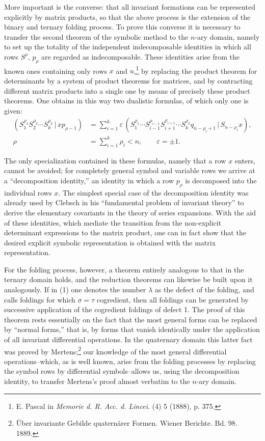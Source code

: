 \documentclass[11pt]{article}
\newcommand{\pair}[2]{(#1\,|\,#2)}
\newcommand{\eps}{\varepsilon}
\begin{document}
More important is the converse: that all invariant formations can be represented explicitly by matrix products, so that the above process is the extension of the binary and ternary folding process. To prove this converse it is necessary to transfer the second theorem of the symbolic method to the $n$-ary domain, namely to set up the totality of the independent indecomposable identities in which all rows $S^\rho$, $p_\rho$ are regarded as indecomposable. These identities arise from the known ones containing only rows $x$ and $u$,\footnote{E. Pascal in \emph{Memorie d. R. Acc. d. Lincei}. (4) 5 (1888), p. 375.} by replacing the product theorem for determinants by a system of product theorems for matrices, and by contracting different matrix products into a single one by means of precisely these product theorems. One obtains in this way two dualistic formulas, of which only one is given:
\begin{equation}
\begin{aligned}
 \pair{S_1^{\rho_1}S_2^{\rho_2}\cdots S_k^{\rho_k}}{x p_{\rho-1}}
 &=\sum_{i=1}^{k}\eps\,\pair{S_1^{\rho_1}\cdots S_{i-1}^{\rho_{i-1}}S_{i+1}^{\rho_{i+1}}\cdots S_k^{\rho_k}q_{n-\rho_i+1}}{S_{n-\rho_i}x},\\
 \rho&=\sum_{i=1}^{k}\rho_i<n,\qquad \eps=\pm1.
\end{aligned}
\tag{2}
\end{equation}

The only specialization contained in these formulas, namely that a row $x$ enters, cannot be avoided; for completely general symbol and variable rows we arrive at a ``decomposition identity,'' an identity in which a row $p_\rho$ is decomposed into the individual rows $x$. The simplest special case of the decomposition identity was already used by Clebsch in his ``fundamental problem of invariant theory'' to derive the elementary covariants in the theory of series expansions. With the aid of these identities, which mediate the transition from the non-explicit determinant expressions to the matrix product, one can in fact show that the desired explicit symbolic representation is obtained with the matrix representation.

For the folding process, however, a theorem entirely analogous to that in the ternary domain holds, and the reduction theorems can likewise be built upon it analogously. If in (1) one denotes the number $\lambda$ as the defect of the folding, and calls foldings for which $\sigma=\tau$ cogredient, then all foldings can be generated by successive application of the cogredient foldings of defect 1. The proof of this theorem rests essentially on the fact that the most general forms can be replaced by ``normal forms,'' that is, by forms that vanish identically under the application of all invariant differential operations. In the quaternary domain this latter fact was proved by Mertens;\footnote{Über invariante Gebilde quaternärer Formen. Wiener Berichte. Bd. 98. 1889.} our knowledge of the most general differential operations--which, as is well known, arise from the folding processes by replacing the symbol rows by differential symbols--allows us, using the decomposition identity, to transfer Mertens's proof almost verbatim to the $n$-ary domain.
\end{document}
